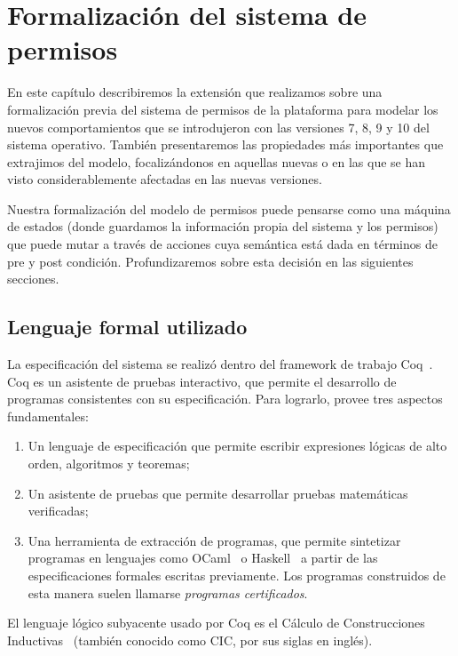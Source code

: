 \chapter{Formalización del sistema de permisos}
\label{chapter:formalization}

En este capítulo describiremos la extensión que realizamos sobre una formalización
previa\cite{luna-cleiej} del sistema de permisos de la plataforma para modelar los nuevos
comportamientos que se introdujeron con las versiones 7, 8, 9 y 10 del sistema operativo. También
presentaremos las propiedades más importantes que extrajimos del modelo, focalizándonos en aquellas
nuevas o en las que se han visto considerablemente afectadas en las nuevas versiones.

Nuestra formalización del modelo de permisos puede pensarse como una máquina de estados (donde
guardamos la información propia del sistema y los permisos) que puede mutar a través de acciones cuya
semántica está dada en términos de pre y post condición. Profundizaremos sobre esta decisión en las
siguientes secciones.

\section{Lenguaje formal utilizado}
\label{section:formalization:formal-language}
La especificación del sistema se realizó dentro del framework de trabajo Coq~\cite{coq}. Coq es un
asistente de pruebas interactivo, que permite el desarrollo de programas consistentes con su especificación.
Para lograrlo, provee tres aspectos fundamentales:
\begin{enumerate}
    \item Un lenguaje de especificación que permite escribir expresiones lógicas de alto orden, algoritmos y teoremas;
    \item Un asistente de pruebas que permite desarrollar pruebas matemáticas verificadas;
    \item Una herramienta de extracción de programas, que permite sintetizar programas en lenguajes
    como OCaml~\cite{ocaml} o Haskell~\cite{haskell} a partir de las especificaciones formales escritas
    previamente. Los programas construidos de esta manera suelen llamarse \textit{programas
    certificados}. 
\end{enumerate}

El lenguaje lógico subyacente usado por Coq es el Cálculo de Construcciones Inductivas~\cite{cic}
(también conocido como CIC, por sus siglas en inglés).

